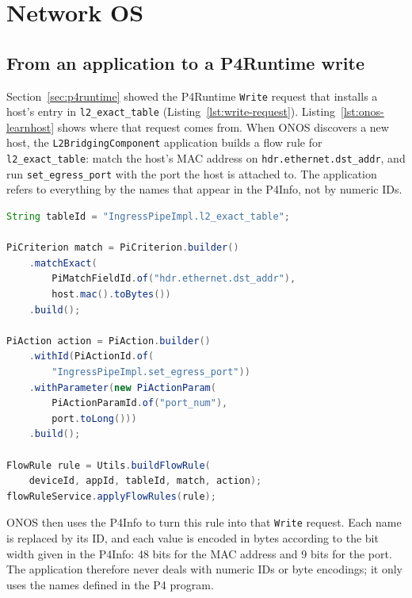 \section{Network OS}\label{sec:onos}

\subsection{From an application to a P4Runtime write}\label{sec:onos-write}
Section~\ref{sec:p4runtime} showed the P4Runtime \texttt{Write} request that installs a host's entry in \texttt{l2\_exact\_table} (Listing~\ref{lst:write-request}). Listing~\ref{lst:onos-learnhost} shows where that request comes from. When ONOS discovers a new host, the \texttt{L2BridgingComponent} application builds a flow rule for \texttt{l2\_exact\_table}: match the host's MAC address on \texttt{hdr.ethernet.dst\_addr}, and run \texttt{set\_egress\_port} with the port the host is attached to. The application refers to everything by the names that appear in the P4Info, not by numeric IDs.

\begin{lstlisting}[language=Java,caption={Building an \texttt{l2\_exact\_table} entry in \texttt{L2BridgingComponent.java} (simplified).},label={lst:onos-learnhost}]
String tableId = "IngressPipeImpl.l2_exact_table";

PiCriterion match = PiCriterion.builder()
    .matchExact(
        PiMatchFieldId.of("hdr.ethernet.dst_addr"),
        host.mac().toBytes())
    .build();

PiAction action = PiAction.builder()
    .withId(PiActionId.of(
        "IngressPipeImpl.set_egress_port"))
    .withParameter(new PiActionParam(
        PiActionParamId.of("port_num"),
        port.toLong()))
    .build();

FlowRule rule = Utils.buildFlowRule(
    deviceId, appId, tableId, match, action);
flowRuleService.applyFlowRules(rule);
\end{lstlisting}

ONOS then uses the P4Info to turn this rule into that \texttt{Write} request. Each name is replaced by its ID, and each value is encoded in bytes according to the bit width given in the P4Info: 48 bits for the MAC address and 9 bits for the port. The application therefore never deals with numeric IDs or byte encodings; it only uses the names defined in the P4 program.
